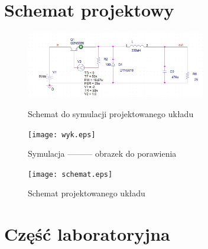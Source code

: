 \documentclass[a4paper,12pt]{article}
\begin{document}
\section {Schemat projektowy}
\begin{figure}[h]
  \center
  \includegraphics[width=0.7\textwidth]{schemat_sim.eps}
  \caption{Schemat do symulacji projektowanego układu}

  \center
  \texttt{[image: wyk.eps]}
  \caption{Symulacja --------- obrazek do porawienia}

  \center
  \texttt{[image: schemat.eps]}
  \caption{Schemat projektowanego układu}
\end{figure}

\pagebreak
\section{Część laboratoryjna}
\end{document}
